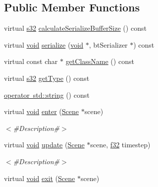 \subsection*{Public Member Functions}
\begin{DoxyCompactItemize}
\item 
virtual \mbox{\hyperlink{_util_8h_aa62c75d314a0d1f37f79c4b73b2292e2}{s32}} \mbox{\hyperlink{classnjli_1_1_scene_state_a274aa78664eb18d3787d5a4034f85c07}{calculate\+Serialize\+Buffer\+Size}} () const
\item 
virtual \mbox{\hyperlink{_thread_8h_af1e856da2e658414cb2456cb6f7ebc66}{void}} \mbox{\hyperlink{classnjli_1_1_scene_state_a15557415360834103de80e85e235cb78}{serialize}} (\mbox{\hyperlink{_thread_8h_af1e856da2e658414cb2456cb6f7ebc66}{void}} $\ast$, bt\+Serializer $\ast$) const
\item 
virtual const char $\ast$ \mbox{\hyperlink{classnjli_1_1_scene_state_afde64dfd84a8b1cd1b648225231e7ae7}{get\+Class\+Name}} () const
\item 
virtual \mbox{\hyperlink{_util_8h_aa62c75d314a0d1f37f79c4b73b2292e2}{s32}} \mbox{\hyperlink{classnjli_1_1_scene_state_a8945a471807893c9442a17766dbf5dd2}{get\+Type}} () const
\item 
\mbox{\hyperlink{classnjli_1_1_scene_state_ac1daf5f9a9bba0a4700f8fa75d7b488b}{operator std\+::string}} () const
\item 
virtual \mbox{\hyperlink{_thread_8h_af1e856da2e658414cb2456cb6f7ebc66}{void}} \mbox{\hyperlink{classnjli_1_1_scene_state_a6d0c25d933938e8542f7bd17fdaab8e0}{enter}} (\mbox{\hyperlink{classnjli_1_1_scene}{Scene}} $\ast$scene)
\begin{DoxyCompactList}\small\item\em $<$\#\+Description\#$>$ \end{DoxyCompactList}\item 
virtual \mbox{\hyperlink{_thread_8h_af1e856da2e658414cb2456cb6f7ebc66}{void}} \mbox{\hyperlink{classnjli_1_1_scene_state_afa0b086c1bf0a41bf9caf7408ce2d324}{update}} (\mbox{\hyperlink{classnjli_1_1_scene}{Scene}} $\ast$scene, \mbox{\hyperlink{_util_8h_a5f6906312a689f27d70e9d086649d3fd}{f32}} timestep)
\begin{DoxyCompactList}\small\item\em $<$\#\+Description\#$>$ \end{DoxyCompactList}\item 
virtual \mbox{\hyperlink{_thread_8h_af1e856da2e658414cb2456cb6f7ebc66}{void}} \mbox{\hyperlink{classnjli_1_1_scene_state_ada2a116a9ed51f7e3e0a0e9e94dc7dfd}{exit}} (\mbox{\hyperlink{classnjli_1_1_scene}{Scene}} $\ast$scene)

\end{DoxyCompactItemize}
